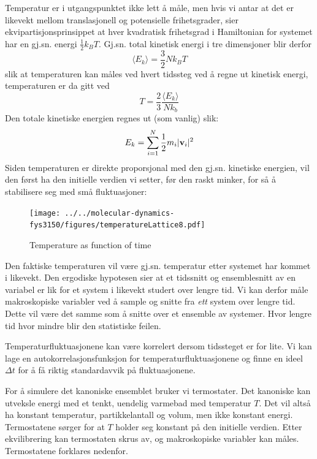 \documentclass[english, a4paper]{article}
\begin{document}
Temperatur er i utgangspunktet ikke lett å måle, men hvis vi antar at det er likevekt mellom
translasjonell og potensielle frihetsgrader, sier ekvipartisjonsprinsippet at hver
kvadratisk frihetsgrad i Hamiltonian for systemet har en gj.sn. energi $\frac{1}{2}k_BT$. 
Gj.sn. total kinetisk energi i tre dimensjoner blir derfor
\begin{equation}
 \langle E_k \rangle = \frac{3}{2}Nk_BT
\end{equation}
slik at temperaturen kan måles ved hvert tidssteg ved å regne ut kinetisk energi,
temperaturen er da gitt ved
\begin{equation}
 T = \frac{2}{3} \frac{\langle E_k \rangle}{Nk_b}
\end{equation}
Den totale kinetiske energien regnes ut (som vanlig) slik:
\begin{equation}
 E_k = \sum_{i=1}^N \frac{1}{2}m_i|{\bf v}_i|^2
\end{equation}
Siden temperaturen er direkte proporsjonal med den gj.sn. kinetiske energien, vil den først ha
den initielle verdien vi setter, før den raskt minker, for så å stabilisere seg med små fluktuasjoner:
\begin{figure}[H]
\begin{center}
  \texttt{[image: ../../molecular-dynamics-fys3150/figures/temperatureLattice8.pdf]}
  \caption{Temperature as function of time}\label{fig:fig2}
  \end{center}
\end{figure}
Den faktiske temperaturen vil være gj.sn. temperatur etter systemet har kommet i likevekt.
Den ergodiske hypotesen sier at et tidssnitt og ensemblesnitt av en variabel er lik for et 
system i likevekt studert over lengre tid. Vi kan derfor måle makroskopiske variabler
ved å sample og snitte fra \textit{ett} system over lengre tid. Dette vil være det samme
som å snitte over et ensemble av systemer. Hvor lengre tid hvor mindre blir
den statistiske feilen.

\noindent
Temperaturfluktuasjonene kan være korrelert dersom tidssteget er for lite. 
Vi kan lage en autokorrelasjonsfunksjon for temperaturfluktuasjonene og finne en ideel $\Delta t$ 
for å få riktig standardavvik på fluktuasjonene. 

\noindent
For å simulere det kanoniske ensemblet bruker vi termostater. Det kanoniske kan utveksle energi
med et tenkt, uendelig varmebad med temperatur $T$. Det vil altså ha konstant temperatur, 
partikkelantall og volum, men ikke konstant energi. Termostatene sørger for at $T$ holder seg
konstant på den initielle verdien. Etter ekvilibrering kan termostaten skrus av, og 
makroskopiske variabler kan måles. Termostatene forklares nedenfor. 
\end{document}
